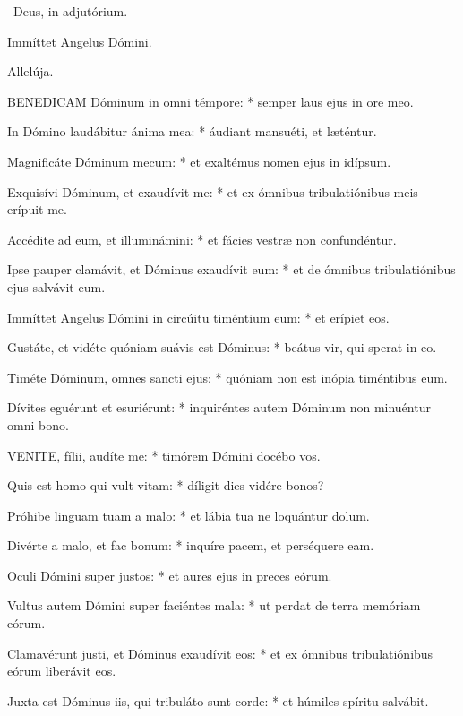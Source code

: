 \V\ Deus, in adjutórium.


 Immíttet Angelus Dómini.


 Allelúja.


\lettrine[lines=2]{B}{ENEDICAM} Dóminum in omni témpore: * semper laus ejus in ore meo.

In Dómino laudábitur ánima mea: * áudiant mansuéti, et læténtur.

Magnificáte Dóminum mecum: * et exaltémus nomen ejus in idípsum.

Exquisívi Dóminum, et exaudívit me: * et ex ómnibus tribulatiónibus meis erípuit me.

Accédite ad eum, et illuminámini: * et fácies vestræ non confundéntur.

Ipse pauper clamávit, et Dóminus exaudívit eum: * et de ómnibus tribulatiónibus ejus salvávit eum.

Immíttet Angelus Dómini in circúitu timéntium eum: * et erípiet eos.

Gustáte, et vidéte quóniam suávis est Dóminus: * beátus vir, qui sperat in eo.

Timéte Dóminum, omnes sancti ejus: * quóniam non est inópia timéntibus eum.

Dívites eguérunt et esuriérunt: * inquiréntes autem Dóminum non minuéntur omni bono.


\lettrine[lines=2]{V}{ENITE}, fílii, audíte me: * timórem Dómini docébo vos.

Quis est homo qui vult vitam: * díligit dies vidére bonos?

Próhibe linguam tuam a malo: * et lábia tua ne loquántur dolum.

Divérte a malo, et fac bonum: * inquíre pacem, et perséquere eam.

Oculi Dómini super justos: * et aures ejus in preces eórum.

Vultus autem Dómini super faciéntes mala: * ut perdat de terra memóriam eórum.

Clamavérunt justi, et Dóminus exaudívit eos: * et ex ómnibus tribulatiónibus eórum liberávit eos.

Juxta est Dóminus iis, qui tribuláto sunt corde: * et húmiles spíritu salvábit.

